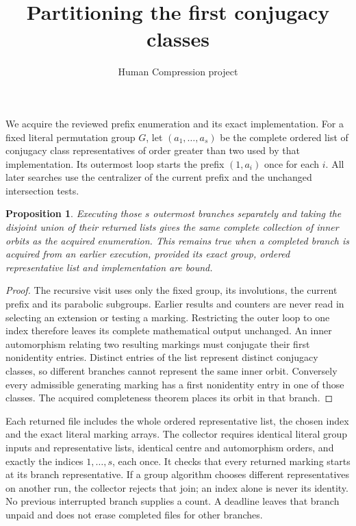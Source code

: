 \documentclass[11pt,a4paper]{article}
\title{Partitioning the first conjugacy classes}
\author{Human Compression project}\date{}
\newtheorem{proposition}{Proposition}
\begin{document}
\maketitle
We acquire the reviewed prefix enumeration and its exact implementation.
For a fixed literal permutation group $G$, let $(a_1,\ldots,a_s)$ be
the complete ordered list of conjugacy class representatives of order
greater than two used by that implementation. Its outermost loop starts
the prefix $(1,a_i)$ once for each $i$. All later searches use the
centralizer of the current prefix and the unchanged intersection tests.

\begin{proposition}
Executing those $s$ outermost branches separately and taking the disjoint
union of their returned lists gives the same complete collection of inner
orbits as the acquired enumeration. This remains true when a completed
branch is acquired from an earlier execution, provided its exact group,
ordered representative list and implementation are bound.
\end{proposition}
\begin{proof}
The recursive visit uses only the fixed group, its involutions, the
current prefix and its parabolic subgroups. Earlier results and counters
are never read in selecting an extension or testing a marking. Restricting
the outer loop to one index therefore leaves its complete mathematical
output unchanged. An inner automorphism relating two resulting markings
must conjugate their first nonidentity entries. Distinct entries of the
list represent distinct conjugacy classes, so different branches cannot
represent the same inner orbit. Conversely every admissible generating
marking has a first nonidentity entry in one of those classes. The
acquired completeness theorem places its orbit in that branch.
\end{proof}

Each returned file includes the whole ordered representative list, the
chosen index and the exact literal marking arrays. The collector requires
identical literal group inputs and representative lists, identical centre
and automorphism orders, and exactly the indices $1,\ldots,s$, each once.
It checks that every returned marking starts at its branch representative.
If a group algorithm chooses different representatives on another run,
the collector rejects that join; an index alone is never its identity.
No previous interrupted branch supplies a count. A deadline leaves that
branch unpaid and does not erase completed files for other branches.
\end{document}
